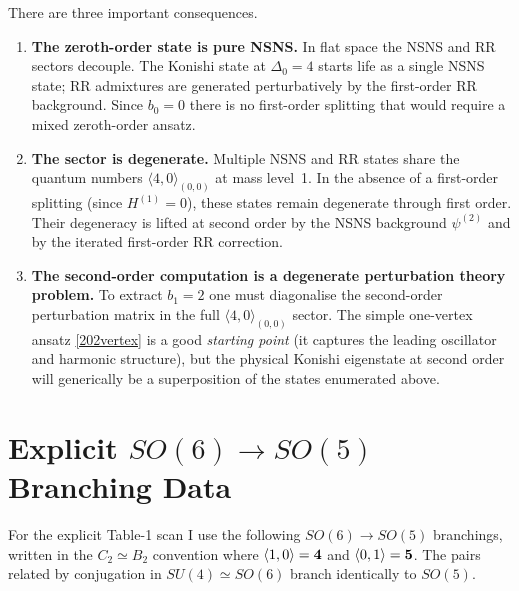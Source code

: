 \documentclass[12pt]{article}
\newcommand{\D}{\ensuremath{\Delta}}
\begin{document}
There are three important consequences.
\begin{enumerate}
\item \textbf{The zeroth-order state is pure NSNS.}
In flat space the NSNS and RR sectors decouple.  The Konishi state at $\D_0=4$ starts life
as a single NSNS state; RR admixtures are generated perturbatively
by the first-order RR background.  Since $b_0=0$ there is no first-order splitting that
would require a mixed zeroth-order ansatz.

\item \textbf{The sector is degenerate.}
Multiple NSNS and RR states share the quantum numbers $\langle 4,0\rangle_{(0,0)}$ at
mass level~1. In the absence of a first-order splitting (since $H^{(1)}=0$), these
states remain degenerate through first order. Their degeneracy is lifted at
second order by the NSNS background $\psi^{(2)}$ and by the iterated first-order
RR correction.

\item \textbf{The second-order computation is a degenerate perturbation theory problem.}
To extract $b_1=2$ one must diagonalise the second-order perturbation matrix in the full
$\langle 4,0\rangle_{(0,0)}$ sector. The simple one-vertex ansatz \eqref{202vertex}
is a good \emph{starting point} (it captures the leading oscillator and harmonic structure),
but the physical Konishi eigenstate at second order will generically be a superposition of
the states enumerated above.
\end{enumerate}

\appendix

\section{Explicit \texorpdfstring{$SO(6)\to SO(5)$}{SO(6)->SO(5)} Branching Data}
\label{app:branching}

For the explicit Table-1 scan I use the following $SO(6)\to SO(5)$ branchings, written in the
$C_2\simeq B_2$ convention where $\langle 1,0\rangle={\bf 4}$ and $\langle 0,1\rangle={\bf 5}$.
The pairs related by conjugation in $SU(4)\simeq SO(6)$ branch identically to $SO(5)$.
\end{document}
